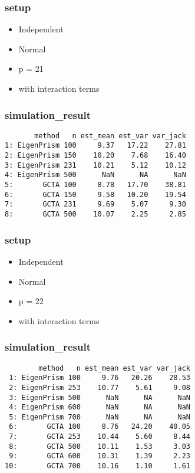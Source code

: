 \documentclass[]{article}
\providecommand{\tightlist}{%
  \setlength{\itemsep}{0pt}\setlength{\parskip}{0pt}}
\begin{document}
\subsubsection{setup}\label{setup}

\begin{itemize}
\tightlist
\item
  Independent
\item
  Normal
\item
  p = 21
\item
  with interaction terms
\end{itemize}

\subsubsection{simulation\_result}\label{simulation_result}

\begin{verbatim}
       method   n est_mean est_var var_jack
1: EigenPrism 100     9.37   17.22    27.81
2: EigenPrism 150    10.20    7.68    16.40
3: EigenPrism 231    10.21    5.12    10.12
4: EigenPrism 500      NaN      NA      NaN
5:       GCTA 100     8.78   17.70    38.81
6:       GCTA 150     9.58   10.20    19.54
7:       GCTA 231     9.69    5.07     9.30
8:       GCTA 500    10.07    2.25     2.85
\end{verbatim}

\subsubsection{setup}\label{setup-1}

\begin{itemize}
\tightlist
\item
  Independent
\item
  Normal
\item
  p = 22
\item
  with interaction terms
\end{itemize}

\subsubsection{simulation\_result}\label{simulation_result-1}

\begin{verbatim}
        method   n est_mean est_var var_jack
 1: EigenPrism 100     9.76   20.26    28.53
 2: EigenPrism 253    10.77    5.61     9.08
 3: EigenPrism 500      NaN      NA      NaN
 4: EigenPrism 600      NaN      NA      NaN
 5: EigenPrism 700      NaN      NA      NaN
 6:       GCTA 100     8.76   24.20    40.05
 7:       GCTA 253    10.44    5.60     8.44
 8:       GCTA 500    10.11    1.53     3.03
 9:       GCTA 600    10.31    1.39     2.23
10:       GCTA 700    10.16    1.10     1.61
\end{verbatim}
\end{document}
